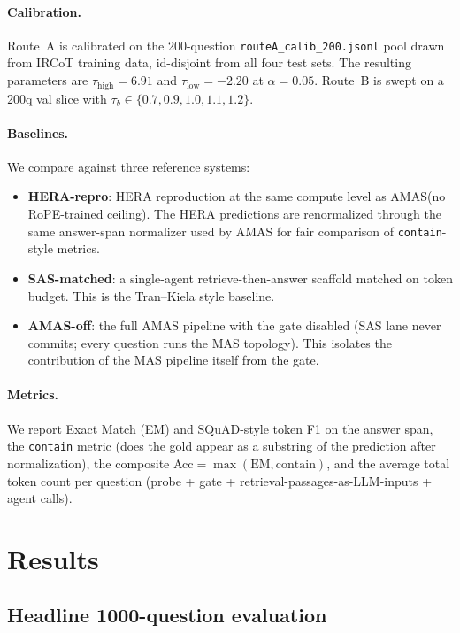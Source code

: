 \documentclass[11pt]{article}
\newcommand{\amas}{AMAS\xspace}
\newcommand{\hera}{HERA\xspace}
\newcommand{\sas}{SAS\xspace}
\newcommand{\mas}{MAS\xspace}
\newcommand{\code}[1]{\texttt{\small #1}}
\begin{document}
\paragraph{Calibration.}
Route~A is calibrated on the 200-question \code{routeA\_calib\_200.jsonl}
pool drawn from IRCoT training data, id-disjoint from all four test sets.
The resulting parameters are $\tau_{\text{high}}=6.91$ and
$\tau_{\text{low}}=-2.20$ at $\alpha=0.05$. Route~B is swept on a 200q
val slice with $\tau_b \in \{0.7,0.9,1.0,1.1,1.2\}$.

\paragraph{Baselines.}
We compare against three reference systems:
\begin{itemize}[leftmargin=*,nosep]
  \item \textbf{HERA-repro}: \hera reproduction at the same compute level
        as \amas (no RoPE-trained ceiling). The \hera predictions are
        renormalized through the same answer-span normalizer used by \amas
        for fair comparison of \texttt{contain}-style metrics.
  \item \textbf{SAS-matched}: a single-agent retrieve-then-answer scaffold
        matched on token budget. This is the Tran--Kiela style baseline.
  \item \textbf{AMAS-off}: the full \amas pipeline with the gate disabled
        (\sas lane never commits; every question runs the \mas topology).
        This isolates the contribution of the \mas pipeline itself from the
        gate.
\end{itemize}

\paragraph{Metrics.}
We report Exact Match (EM) and SQuAD-style token F1 on the answer span,
the \texttt{contain} metric (does the gold appear as a substring of the
prediction after normalization), the composite Acc${} = \max(\text{EM},
\text{contain})$, and the average total token count per question (probe +
gate + retrieval-passages-as-LLM-inputs + agent calls).

\section{Results}
\label{sec:results}

\subsection{Headline 1000-question evaluation}
\end{document}
